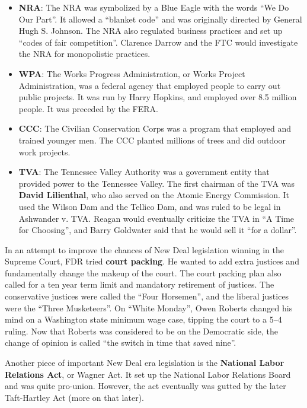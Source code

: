 \begin{itemize}
  \item
    \textbf{NRA}:
    The NRA was symbolized by a Blue Eagle with the words ``We Do Our Part''.
    It allowed a ``blanket code'' and was originally directed by General Hugh S. Johnson.
    The NRA also regulated business practices and set up ``codes of fair competition''.
    Clarence Darrow and the FTC would investigate the NRA for monopolistic practices.

  \item
    \textbf{WPA}:
    The Works Progress Administration, or Works Project Administration,
    was a federal agency that employed people to carry out public projects.
    It was run by Harry Hopkins, and employed over 8.5 million people.
    It was preceded by the FERA\@.

  \item
    \textbf{CCC}:
    The Civilian Conservation Corps was a program that employed and trained younger men.
    The CCC planted millions of trees and did outdoor work projects.

  \item
    \textbf{TVA}:
    The Tennessee Valley Authority was a government entity
    that provided power to the Tennessee Valley.
    The first chairman of the TVA was \textbf{David Lilienthal},
    who also served on the Atomic Energy Commission.
    It used the Wilson Dam and the Tellico Dam, and was ruled to be legal in Ashwander v. TVA\@.
    Reagan would eventually criticize the TVA in ``A Time for Choosing'',
    and Barry Goldwater said that he would sell it ``for a dollar''.
\end{itemize}

In an attempt to improve the chances of New Deal legislation winning in the Supreme Court,
FDR tried \textbf{court packing}.
He wanted to add extra justices and fundamentally change the makeup of the court.
The court packing plan also called for a ten year term limit and mandatory retirement of justices.
The conservative justices were called the ``Four Horsemen'',
and the liberal justices were the ``Three Musketeers''.
On ``White Monday'', Owen Roberts changed his mind on a Washington state minimum wage case,
tipping the court to a 5--4 ruling.
Now that Roberts was considered to be on the Democratic side,
the change of opinion is called ``the switch in time that saved nine''.

Another piece of important New Deal era legislation is the \textbf{National Labor Relations Act},
or Wagner Act.
It set up the National Labor Relations Board and was quite pro-union.
However, the act eventually was gutted by the later Taft-Hartley Act (more on that later).
